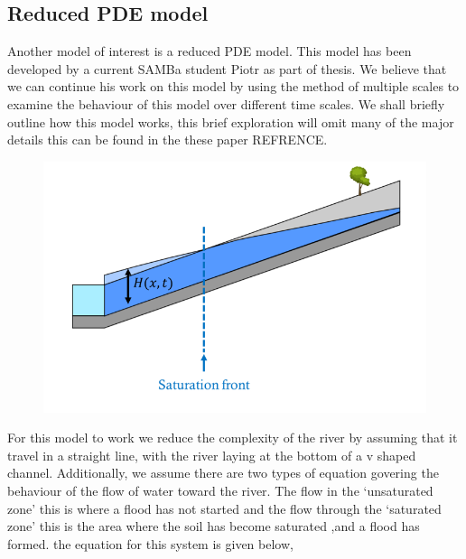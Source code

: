 \documentclass[11pt]{article}
\begin{document}
\subsection{Reduced PDE model}
Another model of interest is a reduced PDE model. This model has been developed by a current SAMBa student Piotr as part of thesis. 
We believe that we can continue his work on this model by using the method of multiple scales to examine the behaviour of this model over different time scales.
We shall briefly outline how this model works, this brief exploration will omit many of the major details this can be found in the these paper REFRENCE.

\vspace{5pt}
\begin{minipage}{0.55\textwidth}
    \begin{figure}[H]%
    \centering
    \includegraphics[width=\textwidth]{Figs/Simple model.png}
    \label{fig:model}
    \end{figure}
\end{minipage}
\hspace{0.05\textwidth}
\begin{minipage}{0.35\textwidth}
    \qquad For this model to work we reduce the complexity of the river by assuming that it travel in a straight line, with the river laying at the bottom of a v shaped channel. Additionally, we assume there are two types of equation govering the behaviour of the flow of water toward the river. 
    The flow in the `unsaturated zone' this is where a flood has not started and the flow through the `saturated zone' this is the area where the soil has become saturated ,and a flood has formed. the equation for this system is given below,
    
\end{minipage}
\end{document}
